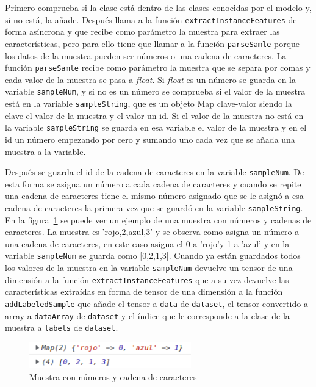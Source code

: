 \documentclass[a4paper, 12pt]{book}
\begin{document}
Primero comprueba si la clase está dentro de las clases conocidas por el modelo y, si no está, la añade. 
Después llama a la función \texttt{extractInstanceFeatures} de forma asíncrona y que recibe como parámetro la muestra para extraer las características, pero para ello tiene que llamar a la función \texttt{parseSamle} porque los datos de la muestra pueden ser números o una cadena de caracteres. 
La función \texttt{parseSamle} recibe como parámetro la muestra que se separa por comas y cada valor de la muestra se pasa a \emph{float}. Si \emph{float} es un número se guarda en la variable \texttt{sampleNum}, y si no es un número se comprueba si el valor de la muestra está en la variable \texttt{sampleString}, que es un objeto Map clave-valor siendo la clave el valor de la muestra y el valor un id. 
Si el valor de la muestra no está en la variable \texttt{sampleString} se guarda en esa variable el valor de la muestra y en el id un número empezando por cero y sumando uno cada vez que se añada una muestra a la variable. 

Después se guarda el id de la cadena de caracteres en la variable \texttt{sampleNum}. De esta forma se asigna un número a cada cadena de caracteres y cuando se repite una cadena de caracteres tiene el mismo número asignado que se le asignó a esa cadena de caracteres la primera vez que se guardó en la variable \texttt{sampleString}. 
En la figura~\ref{fig:ejemplo2} se puede ver un ejemplo de una muestra con números y cadenas de caracteres. La muestra es 'rojo,2,azul,3' y se observa como asigna un número a una cadena de caracteres, en este caso asigna el 0 a 'rojo'y 1 a 'azul' y en la variable \texttt{sampleNum} se guarda como [0,2,1,3]. 
Cuando ya están guardados todos los valores de la muestra en la variable \texttt{sampleNum} devuelve un tensor de una dimensión a la función \texttt{extractInstanceFeatures} que a su vez devuelve las características extraídas en forma de tensor de una dimensión a la función \texttt{addLabeledSample} que añade el tensor a \texttt{data} de \texttt{dataset}, el tensor convertido a array a \texttt{dataArray} de \texttt{dataset} y el índice que le corresponde a la clase de la muestra a \texttt{labels} de \texttt{dataset}.

\begin{figure}
	\centering
	\includegraphics[width=7cm, keepaspectratio]{img/ejemplo2.png}
	\caption{Muestra con números y cadena de caracteres} 	\label{fig:ejemplo2}
\end{figure}
\end{document}
